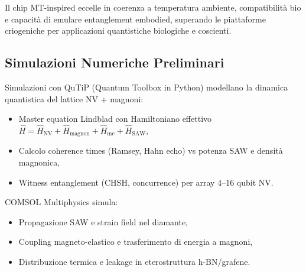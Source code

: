 \documentclass[12pt,a4paper]{article}
\begin{document}
\begin{table}[htbp]
\centering
\caption{Confronto tra chip MT-inspired proposto e piattaforme quantistiche di stato dell'arte (valori tipici 2025--2026).}
\label{tab:comparison}
\end{table}

Il chip MT-inspired eccelle in coerenza a temperatura ambiente, compatibilità bio e capacità di emulare entanglement embodied, superando le piattaforme criogeniche per applicazioni quantistiche biologiche e coscienti.

\subsection{Simulazioni Numeriche Preliminari}

Simulazioni con QuTiP (Quantum Toolbox in Python) modellano la dinamica quantistica del lattice NV + magnoni:
\begin{itemize}
    \item Master equation Lindblad con Hamiltoniano effettivo $\hat{H} = \hat{H}_{\mathrm{NV}} + \hat{H}_{\mathrm{magnon}} + \hat{H}_{\mathrm{me}} + \hat{H}_{\mathrm{SAW}}$,
    \item Calcolo coherence times (Ramsey, Hahn echo) vs potenza SAW e densità magnonica,
    \item Witness entanglement (CHSH, concurrence) per array 4--16 qubit NV.
\end{itemize}

COMSOL Multiphysics simula:
\begin{itemize}
    \item Propagazione SAW e strain field nel diamante,
    \item Coupling magneto-elastico e trasferimento di energia a magnoni,
    \item Distribuzione termica e leakage in eterostruttura h-BN/grafene.
\end{itemize}
\end{document}
